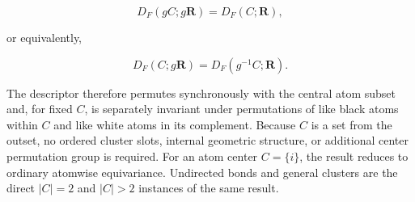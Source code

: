 \[
D_F(gC;g\mathbf R)=D_F(C;\mathbf R),
\]

or equivalently,

\[
D_F(C;g\mathbf R)=D_F(g^{-1}C;\mathbf R).
\]

The descriptor therefore permutes synchronously with the central atom subset and, for fixed \(C\), is separately invariant under permutations of like black atoms within \(C\) and like white atoms in its complement. Because \(C\) is a set from the outset, no ordered cluster slots, internal geometric structure, or additional center permutation group is required. For an atom center \(C=\{i\}\), the result reduces to ordinary atomwise equivariance. Undirected bonds and general clusters are the direct \(|C|=2\) and \(|C|>2\) instances of the same result.
